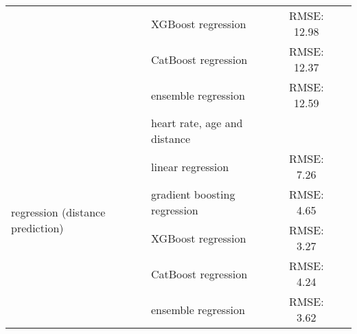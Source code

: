 \begin{longtable}{llrrrrr}
    & XGBoost regression & \multicolumn{4}{c}{RMSE: 12.98} & \\
    & CatBoost regression & \multicolumn{4}{c}{RMSE: 12.37} & \\
    & ensemble regression & \multicolumn{4}{c}{RMSE: 12.59} & \\
    \midrule
    \multirow{6}{*}{regression (distance prediction)} 
    & heart rate, age and distance &  \\
    & linear regression & \multicolumn{4}{c}{RMSE: 7.26} & \\
    & gradient boosting regression & \multicolumn{4}{c}{RMSE: 4.65} & \\
    & XGBoost regression & \multicolumn{4}{c}{RMSE: 3.27} & \\
    & CatBoost regression & \multicolumn{4}{c}{RMSE: 4.24} & \\
    & ensemble regression & \multicolumn{4}{c}{RMSE: 3.62} & \\
    \bottomrule
\end{longtable}
\FloatBarrier
\normalsize